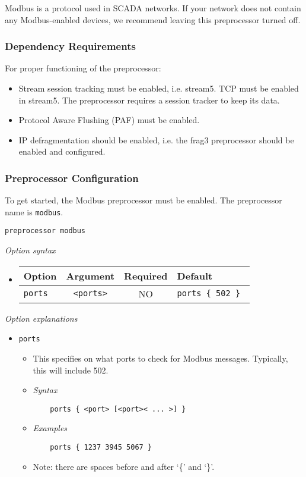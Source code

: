 \documentclass[english]{report}
\begin{document}
Modbus is a protocol used in SCADA networks. If your network does not contain any
Modbus-enabled devices, we recommend leaving this preprocessor turned off.

\subsubsection{Dependency Requirements}

For proper functioning of the preprocessor:
\begin{itemize}

\item Stream session tracking must be enabled, i.e. stream5. TCP must be
      enabled in stream5. The preprocessor requires a session tracker to keep its 
      data.

\item Protocol Aware Flushing (PAF) must be enabled.

\item IP defragmentation should be enabled, i.e. the frag3 preprocessor should be
      enabled and configured.

\end{itemize}

\subsubsection{Preprocessor Configuration}
To get started, the Modbus preprocessor must be enabled.
The preprocessor name is \texttt{modbus}.
\begin{verbatim}
preprocessor modbus
\end{verbatim}
\textit{Option syntax}
\begin{itemize}
\item[]
\begin{tabular}{|l|c|c|p{6cm}|}
\hline
Option & Argument & Required & Default\\
\hline
\hline
\texttt{ports} & \texttt{<ports>} & NO & \texttt{ports \{ 502 \} }\\
\hline
\end{tabular}
\end{itemize}
\normalsize
\textit{Option explanations}
\begin{itemize}
\item[] \texttt{ports}
\begin{itemize}
\item[]  This specifies on what ports to check for Modbus messages. Typically, 
     this will include 502.
\item[] \textit{Syntax}
\begin{verbatim}
    ports { <port> [<port>< ... >] }
\end{verbatim}
\item[] \textit{Examples}
\begin{verbatim}
    ports { 1237 3945 5067 }
\end{verbatim}
\item[] Note: there are spaces before and after `\{' and `\}'.
\end{itemize}
\end{itemize}
\normalsize
\end{document}
